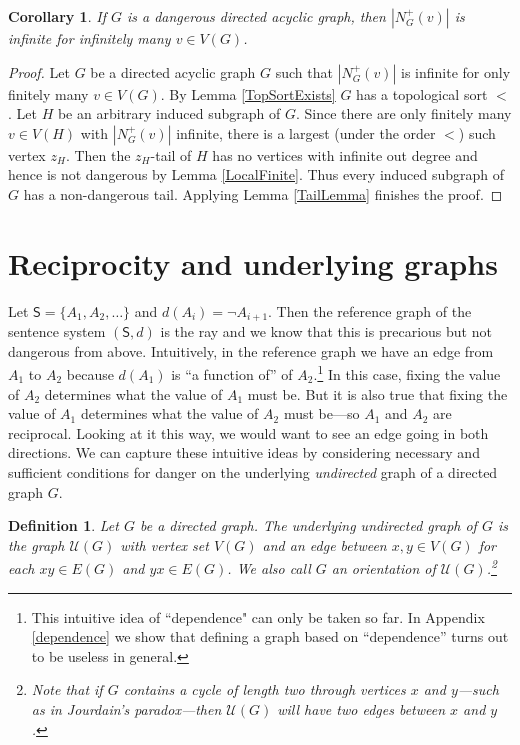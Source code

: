\documentclass[12pt]{kluwer}
\newtheorem{cor}[thm]{Corollary}
\newtheorem{defn}{Definition}
\theoremstyle{remark}
\newcommand{\fancy}[1]{\mathcal{#1}}
\def\S{\textsf{S}}
\def\U{\fancy{U}}
\begin{document}
\begin{cor}\label{InfinitelyManyInfinite}
If $G$ is a dangerous directed acyclic graph, then $|N^{+}_G(v)|$ is infinite for infinitely many $v \in V(G)$.
\end{cor}
\begin{proof}
Let $G$ be a directed acyclic graph $G$ such that $|N^{+}_G(v)|$ is infinite for only finitely many $v \in V(G)$.  By Lemma \ref{TopSortExists} $G$ has a topological sort $<$.  Let $H$ be an arbitrary induced subgraph of $G$. Since there are only finitely many $v \in V(H)$ with $|N^{+}_G(v)|$ infinite, there is a largest (under the order $<$) such vertex $z_H$.  Then the $z_H$-tail of $H$ has no vertices with infinite out degree and hence is not dangerous by Lemma \ref{LocalFinite}.  Thus every induced subgraph of $G$ has a non-dangerous tail.  Applying Lemma \ref{TailLemma} finishes the proof.
\end{proof}

\section{Reciprocity and underlying graphs}
\label{recip}
Let $\S = \{A_1, A_2, \ldots\}$ and $d(A_i) = \neg A_{i+1}$.  Then the reference graph of the sentence system $(\S, d)$ is the ray and we know that this is precarious but not dangerous from above.  Intuitively, in the reference graph we have an edge from $A_1$ to $A_2$ because $d(A_1)$ is ``a function of'' of $A_2$.\footnote{This intuitive idea of ``dependence" can only be taken so far. In Appendix \ref{dependence} we show that defining a graph based on ``dependence'' turns out to be useless in general.} In this case, fixing the value of $A_2$ determines what the value of $A_1$ must be.  But it is also true that fixing the value of $A_1$ determines what the value of $A_2$ must be---so $A_1$ and $A_2$ are reciprocal. Looking at it this way, we would want to see an edge going in both directions.  We can capture these intuitive ideas by considering necessary and sufficient conditions for danger on the underlying \textit{undirected} graph of a directed graph $G$.

\begin{defn}
Let $G$ be a directed graph.  The \emph{underlying undirected graph} of $G$ is the graph $\U(G)$ with vertex set $V(G)$ and an edge between $x, y \in V(G)$ for each $xy \in E(G)$ and $yx \in E(G)$.  We also call $G$ an \emph{orientation} of $\U(G)$.\footnote{Note that if $G$ contains a cycle of length two through vertices $x$ and $y$---such as in Jourdain's paradox---then $\U(G)$ will have two edges between $x$ and $y$.}
\end{defn}
\end{document}
